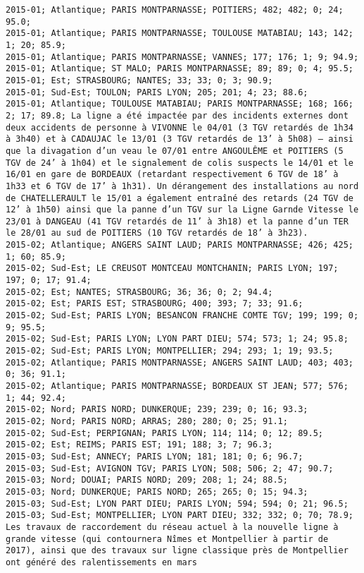 \documentclass{article}
\begin{document}
\begin{Verbatim}[commandchars=\\\{\}]
2015-01; Atlantique; PARIS MONTPARNASSE; POITIERS; 482; 482; 0; 24; 95.0; 
2015-01; Atlantique; PARIS MONTPARNASSE; TOULOUSE MATABIAU; 143; 142; 1; 20; 85.9; 
2015-01; Atlantique; PARIS MONTPARNASSE; VANNES; 177; 176; 1; 9; 94.9; 
2015-01; Atlantique; ST MALO; PARIS MONTPARNASSE; 89; 89; 0; 4; 95.5; 
2015-01; Est; STRASBOURG; NANTES; 33; 33; 0; 3; 90.9; 
2015-01; Sud-Est; TOULON; PARIS LYON; 205; 201; 4; 23; 88.6; 
2015-01; Atlantique; TOULOUSE MATABIAU; PARIS MONTPARNASSE; 168; 166; 2; 17; 89.8; La ligne a été impactée par des incidents externes dont deux accidents de personne à VIVONNE le 04/01 (3 TGV retardés de 1h34 à 3h40) et à CADAUJAC le 13/01 (3 TGV retardés de 13’ à 5h08) – ainsi que la divagation d’un veau le 07/01 entre ANGOULÊME et POITIERS (5 TGV de 24’ à 1h04) et le signalement de colis suspects le 14/01 et le 16/01 en gare de BORDEAUX (retardant respectivement 6 TGV de 18’ à 1h33 et 6 TGV de 17’ à 1h31). Un dérangement des installations au nord de CHATELLERAULT le 15/01 a également entraîné des retards (24 TGV de 12’ à 1h50) ainsi que la panne d’un TGV sur la Ligne Garnde Vitesse le 23/01 à DANGEAU (41 TGV retardés de 11’ à 3h18) et la panne d’un TER le 28/01 au sud de POITIERS (10 TGV retardés de 18’ à 3h23).
2015-02; Atlantique; ANGERS SAINT LAUD; PARIS MONTPARNASSE; 426; 425; 1; 60; 85.9; 
2015-02; Sud-Est; LE CREUSOT MONTCEAU MONTCHANIN; PARIS LYON; 197; 197; 0; 17; 91.4; 
2015-02; Est; NANTES; STRASBOURG; 36; 36; 0; 2; 94.4; 
2015-02; Est; PARIS EST; STRASBOURG; 400; 393; 7; 33; 91.6; 
2015-02; Sud-Est; PARIS LYON; BESANCON FRANCHE COMTE TGV; 199; 199; 0; 9; 95.5; 
2015-02; Sud-Est; PARIS LYON; LYON PART DIEU; 574; 573; 1; 24; 95.8; 
2015-02; Sud-Est; PARIS LYON; MONTPELLIER; 294; 293; 1; 19; 93.5; 
2015-02; Atlantique; PARIS MONTPARNASSE; ANGERS SAINT LAUD; 403; 403; 0; 36; 91.1; 
2015-02; Atlantique; PARIS MONTPARNASSE; BORDEAUX ST JEAN; 577; 576; 1; 44; 92.4; 
2015-02; Nord; PARIS NORD; DUNKERQUE; 239; 239; 0; 16; 93.3; 
2015-02; Nord; PARIS NORD; ARRAS; 280; 280; 0; 25; 91.1; 
2015-02; Sud-Est; PERPIGNAN; PARIS LYON; 114; 114; 0; 12; 89.5; 
2015-02; Est; REIMS; PARIS EST; 191; 188; 3; 7; 96.3; 
2015-03; Sud-Est; ANNECY; PARIS LYON; 181; 181; 0; 6; 96.7; 
2015-03; Sud-Est; AVIGNON TGV; PARIS LYON; 508; 506; 2; 47; 90.7; 
2015-03; Nord; DOUAI; PARIS NORD; 209; 208; 1; 24; 88.5; 
2015-03; Nord; DUNKERQUE; PARIS NORD; 265; 265; 0; 15; 94.3; 
2015-03; Sud-Est; LYON PART DIEU; PARIS LYON; 594; 594; 0; 21; 96.5; 
2015-03; Sud-Est; MONTPELLIER; LYON PART DIEU; 332; 332; 0; 70; 78.9; Les travaux de raccordement du réseau actuel à la nouvelle ligne à grande vitesse (qui contournera Nîmes et Montpellier à partir de 2017), ainsi que des travaux sur ligne classique près de Montpellier ont généré des ralentissements en mars

\end{Verbatim}
\end{document}

